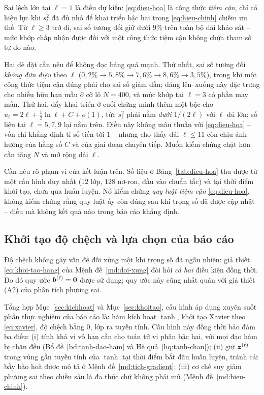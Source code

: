 Sai lệch lớn tại $\ell = 1$ là điều dự kiến: \eqref{eq:dieu-hoa} là công thức
\emph{tiệm cận}, chỉ có hiệu lực khi $s_\ell^2$ đã đủ nhỏ để khai triển bậc hai
trong \eqref{eq:hieu-chinh} chiếm ưu thế. Từ $\ell \ge 3$ trở đi, sai số tương
đối giữ dưới $9\%$ trên toàn bộ dải khảo sát -- mức khớp chấp nhận được đối với
một công thức tiệm cận không chứa tham số tự do nào.

Hai dè dặt cần nêu để không đọc bảng quá mạnh. Thứ nhất, sai số tương đối
\emph{không đơn điệu} theo $\ell$ ($0{,}2\% \to 5{,}8\% \to 7{,}6\% \to 8{,}6\%
\to 3{,}5\%$), trong khi một công thức tiệm cận đúng phải cho sai số giảm dần;
dáng lên--xuống này đặc trưng cho nhiễu hữu hạn mẫu ở cỡ lô $N = 400$, và mức
khớp tại $\ell = 3$ có phần may mắn. Thứ hai, đẩy khai triển ở cuối chứng minh
thêm một bậc cho $u_\ell = 2\ell + \tfrac12\ln\ell + C + o(1)$, tức
$s_\ell^2$ phải nằm \emph{dưới} $1/(2\ell)$ với $\ell$ đủ lớn; số liệu tại
$\ell = 5,7,9$ lại nằm trên. Điều này không mâu thuẫn với
\eqref{eq:dieu-hoa} -- vốn chỉ khẳng định tỉ số tiến tới $1$ -- nhưng cho thấy
dải $\ell \le 11$ còn chịu ảnh hưởng của hằng số $C$ và của giai đoạn chuyển
tiếp. Muốn kiểm chứng chặt hơn cần tăng $N$ và mở rộng dải $\ell$.
 
\begin{nhanxet}
Cần nêu rõ phạm vi của kết luận trên. Số liệu ở Bảng~\ref{tab:dieu-hoa} thu được
từ một cấu hình duy nhất ($12$ lớp, $128$ nơ-ron, đầu vào chuẩn tắc) và tại thời
điểm khởi tạo, chưa qua huấn luyện. Nó kiểm chứng \emph{quy luật tiệm cận}
\eqref{eq:dieu-hoa}, không kiểm chứng rằng quy luật ấy còn đúng sau khi trọng số
đã được cập nhật -- điều mà không kết quả nào trong báo cáo khẳng định.
\end{nhanxet}
 
\subsection{Khởi tạo độ chệch và lựa chọn của báo cáo}
 
Độ chệch không gây vấn đề đối xứng một khi trọng số đã ngẫu nhiên: giả thiết
\eqref{eq:khoi-tao-hang} của Mệnh đề~\ref{md:doi-xung} đòi hỏi \emph{cả hai}
điều kiện đồng thời. Do đó quy ước $\bm{b}^{(\ell)} = \bm{0}$ được sử dụng; quy ước
này cũng nhất quán với giả thiết (A2) của phân tích phương sai.
 
Tổng hợp Mục~\ref{sec:kichhoat} và Mục~\ref{sec:khoitao}, cấu hình áp dụng xuyên
suốt phần thực nghiệm của báo cáo là: hàm kích hoạt $\tanh$, khởi tạo Xavier
theo \eqref{eq:xavier}, độ chệch bằng $0$, lớp ra tuyến tính. Cấu hình
này đồng thời bảo đảm ba điều: (i) tính khả vi vô hạn cần cho toán tử vi phân
bậc hai, với mọi đạo hàm bị chặn đều (Bổ đề~\ref{bd:tanh-dao-ham} và
Hệ quả~\ref{hq:tanh-chan}); (ii) giữ $\bm{z}^{(\ell)}$ trong vùng gần tuyến tính
của $\tanh$ tại thời điểm bắt đầu huấn luyện, tránh cái bẫy bão hoà được mô tả ở
Mệnh đề~\ref{md:tich-gradient}; (iii) cơ chế suy giảm phương sai theo chiều sâu
là đa thức chứ không phải mũ (Mệnh đề~\ref{md:hieu-chinh}).
 
